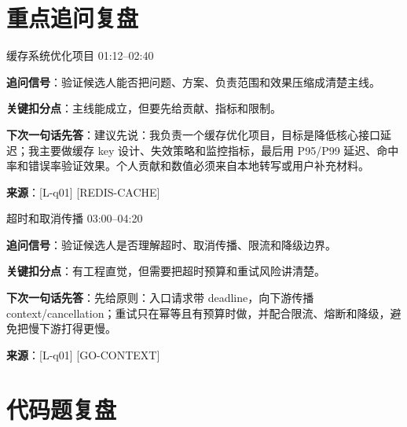 \documentclass[a4paper,11pt]{article}
\begin{document}
\section{重点追问复盘}

\begin{riskbox}{缓存系统优化项目 \hfill 01:12--02:40}

\textbf{追问信号}：验证候选人能否把问题、方案、负责范围和效果压缩成清楚主线。



\textbf{关键扣分点}：主线能成立，但要先给贡献、指标和限制。



\textbf{下次一句话先答}：建议先说：我负责一个缓存优化项目，目标是降低核心接口延迟；我主要做缓存 key 设计、失效策略和监控指标，最后用 P95/P99 延迟、命中率和错误率验证效果。个人贡献和数值必须来自本地转写或用户补充材料。



\textbf{来源}：[L-q01] [REDIS-CACHE]

\end{riskbox}

\begin{riskbox}{超时和取消传播 \hfill 03:00--04:20}

\textbf{追问信号}：验证候选人是否理解超时、取消传播、限流和降级边界。



\textbf{关键扣分点}：有工程直觉，但需要把超时预算和重试风险讲清楚。



\textbf{下次一句话先答}：先给原则：入口请求带 deadline，向下游传播 context/cancellation；重试只在幂等且有预算时做，并配合限流、熔断和降级，避免把慢下游打得更慢。



\textbf{来源}：[L-q01] [GO-CONTEXT]

\end{riskbox}

\section{代码题复盘}
\end{document}
